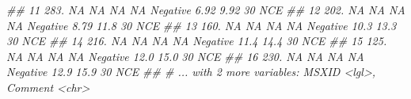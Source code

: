 \documentclass[]{article}
\newcommand{\hlcom}[1]{\textcolor[rgb]{0.502,0.502,0.502}{\textit{#1}}}%
\newenvironment{Shaded}{\begin{myshaded}}{\end{myshaded}}
\newcommand{\DocumentationTok}[1]{\hlcom{#1}}
\begin{document}
\begin{Shaded}
\begin{Highlighting}[]
\DocumentationTok{\#\# 11 283.  NA      NA           NA      NA    Negative  6.92   9.92    30 NCE    }
\DocumentationTok{\#\# 12 202.  NA      NA           NA      NA    Negative  8.79  11.8     30 NCE    }
\DocumentationTok{\#\# 13 160.  NA      NA           NA      NA    Negative 10.3   13.3     30 NCE    }
\DocumentationTok{\#\# 14 216.  NA      NA           NA      NA    Negative 11.4   14.4     30 NCE    }
\DocumentationTok{\#\# 15 125.  NA      NA           NA      NA    Negative 12.0   15.0     30 NCE    }
\DocumentationTok{\#\# 16 230.  NA      NA           NA      NA    Negative 12.9   15.9     30 NCE    }
\DocumentationTok{\#\# \# ... with 2 more variables: MSXID \textless{}lgl\textgreater{}, Comment \textless{}chr\textgreater{}}
\end{Highlighting}
\end{Shaded}
\end{document}
